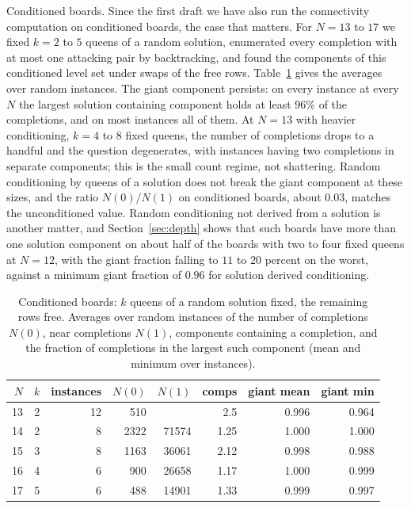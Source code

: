 Conditioned boards. Since the first draft we have also run the connectivity computation on conditioned boards, the case that matters. For $N = 13$ to $17$ we fixed $k = 2$ to $5$ queens of a random solution, enumerated every completion with at most one attacking pair by backtracking, and found the components of this conditioned level set under swaps of the free rows. Table~\ref{tab:conditioned} gives the averages over random instances. The giant component persists: on every instance at every $N$ the largest solution containing component holds at least $96\%$ of the completions, and on most instances all of them. At $N = 13$ with heavier conditioning, $k = 4$ to $8$ fixed queens, the number of completions drops to a handful and the question degenerates, with instances having two completions in separate components; this is the small count regime, not shattering. Random conditioning by queens of a solution does not break the giant component at these sizes, and the ratio $N(0)/N(1)$ on conditioned boards, about $0.03$, matches the unconditioned value. Random conditioning not derived from a solution is another matter, and Section~\ref{sec:depth} shows that such boards have more than one solution component on about half of the boards with two to four fixed queens at $N = 12$, with the giant fraction falling to $11$ to $20$ percent on the worst, against a minimum giant fraction of $0.96$ for solution derived conditioning.

\begin{table}[t]
\centering
\small
\caption{Conditioned boards: $k$ queens of a random solution fixed, the remaining rows free. Averages over random instances of the number of completions $N(0)$, near completions $N(1)$, components containing a completion, and the fraction of completions in the largest such component (mean and minimum over instances).}
\label{tab:conditioned}
\begin{tabular}{rrrrrrrr}
\toprule
$N$ & $k$ & instances & $N(0)$ & $N(1)$ & comps & giant mean & giant min \\
\midrule
13 & 2 & 12 & 510 & & 2.5 & 0.996 & 0.964 \\
14 & 2 & 8 & 2322 & 71574 & 1.25 & 1.000 & 1.000 \\
15 & 3 & 8 & 1163 & 36061 & 2.12 & 0.998 & 0.988 \\
16 & 4 & 6 & 900 & 26658 & 1.17 & 1.000 & 0.999 \\
17 & 5 & 6 & 488 & 14901 & 1.33 & 0.999 & 0.997 \\
\bottomrule
\end{tabular}
\end{table}

